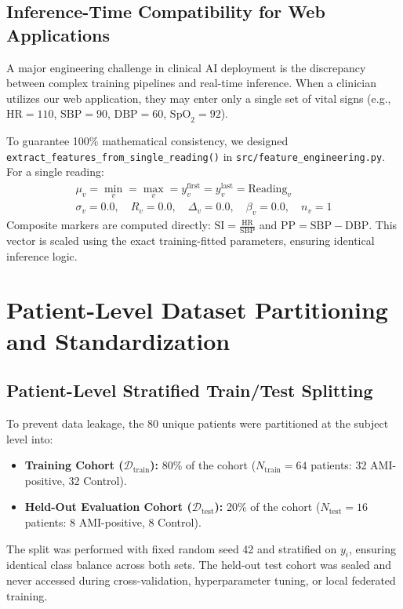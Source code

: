 \subsection{Inference-Time Compatibility for Web Applications}
\label{subsec:inference_compat}

A major engineering challenge in clinical AI deployment is the discrepancy between complex training pipelines and real-time inference. When a clinician utilizes our web application, they may enter only a single set of vital signs (e.g., $\text{HR} = 110$, $\text{SBP} = 90$, $\text{DBP} = 60$, $\text{SpO}_2 = 92$).

To guarantee 100\% mathematical consistency, we designed \texttt{extract\_features\_from\_single\_reading()} in \texttt{src/feature\_engineering.py}. For a single reading:
\begin{align*}
\mu_v = \min_v = \max_v = y_v^{\text{first}} = y_v^{\text{last}} = \text{Reading}_v \\
\sigma_v = 0.0, \quad R_v = 0.0, \quad \Delta_v = 0.0, \quad \beta_v = 0.0, \quad n_v = 1
\end{align*}
Composite markers are computed directly: $\text{SI} = \frac{\text{HR}}{\text{SBP}}$ and $\text{PP} = \text{SBP} - \text{DBP}$. This vector is scaled using the exact training-fitted parameters, ensuring identical inference logic.

\section{Patient-Level Dataset Partitioning and Standardization}
\label{sec:dataset_partitioning}

\subsection{Patient-Level Stratified Train/Test Splitting}
\label{subsec:stratified_split}

To prevent data leakage, the 80 unique patients were partitioned at the subject level into:
\begin{itemize}
    \item \textbf{Training Cohort ($\mathcal{D}_{\text{train}}$):} 80\% of the cohort ($N_{\text{train}} = 64$ patients: 32 AMI-positive, 32 Control).
    \item \textbf{Held-Out Evaluation Cohort ($\mathcal{D}_{\text{test}}$):} 20\% of the cohort ($N_{\text{test}} = 16$ patients: 8 AMI-positive, 8 Control).
\end{itemize}
The split was performed with fixed random seed 42 and stratified on $y_i$, ensuring identical class balance across both sets. The held-out test cohort was sealed and never accessed during cross-validation, hyperparameter tuning, or local federated training.

